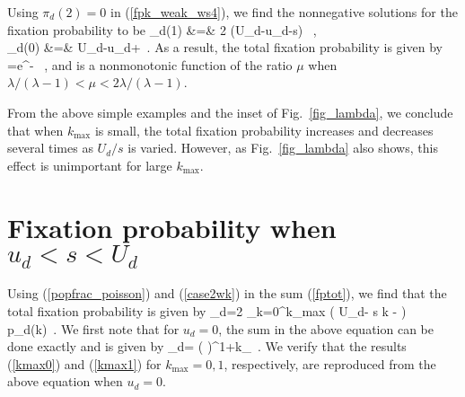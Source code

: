 \documentclass[preprint,12pt,number]{elsarticle}
\begin{document}
 Using $\pi_d(2)=0$ in (\ref{fpk_weak_ws4}), we find the nonnegative solutions for the fixation probability to be
\bea
\pi_d(1) &=& 2 (U_d-u_d-s) ~,\\
\pi_d(0) &=& U_d-u_d+~.
\eea
As a result, the total fixation probability is given by
\be
{}=e^{-\mu}  ~,
\label{kmax1}
\ee
and is a nonmonotonic function of the ratio $\mu$ when $\lambda/(\lambda-1)< \mu < 2 \lambda/(\lambda-1)$. 

From the above simple examples and the inset of Fig.~\ref{fig_lambda}, we conclude that when $k_{\max}$ is small,  the total fixation probability increases and decreases several times as $U_d/s$ is varied. However, as Fig.~\ref{fig_lambda} also shows, this effect is unimportant for large $k_{\max}$. 


\section{Fixation probability when $u_d < s < U_d$}
\label{app_case2w}

Using (\ref{popfrac_poisson}) and (\ref{case2wk}) in the sum (\ref{fptot}), we find that the total fixation probability is given by 
\be
\Pi_d=2 \sum_{k=0}^{k_{max}} \left( U_d- s k -  \right) ~ p_d(k)~.
\label{app_pert2}
\ee
We first note that for $u_d=0$, the sum in the above equation can be done exactly \citep{James:2016} and is given by
\be
\Pi_d=  \left( \right)^{1+k_{\max}}~.
\label{exact0}
\ee
We verify that the results (\ref{kmax0}) and (\ref{kmax1}) for $k_{\max}=0, 1$, respectively, are reproduced from the above equation when $u_d=0$. 
\end{document}
